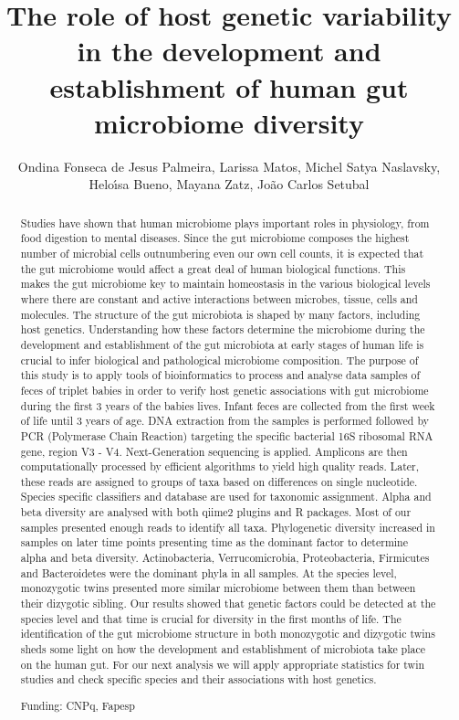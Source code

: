 \documentclass[twoside]{article}
\title{\vspace{-15mm}\fontsize{24pt}{10pt}\selectfont\textbf{ The role of host genetic variability in the development and establishment of human gut microbiome diversity }} %
\author{ Ondina Fonseca de Jesus Palmeira, Larissa Matos, Michel Satya Naslavsky, Helo\'{\i}sa Bueno, Mayana Zatz, Jo\~ao Carlos Setubal }
\affil{ Institute of Mathematics and Statistics - University of S\~ao Paulo }
\date{}
\begin{document}
  
  
  \maketitle %
  
  
  \thispagestyle{fancy} %
  
  
  \begin{abstract}
  Studies have shown that human microbiome plays important roles in physiology,  from food digestion to mental diseases. Since the gut microbiome composes the highest number of microbial cells outnumbering even our own cell counts,  it is expected that the gut microbiome would affect a great deal of human biological functions. This makes the gut microbiome key to maintain homeostasis in the various biological levels where there are constant and active interactions between microbes,  tissue,  cells and molecules. The structure of the gut microbiota is shaped by many factors,  including host genetics. Understanding how these factors determine the microbiome during the development and establishment of the gut microbiota at early stages of human life is crucial to infer biological and pathological microbiome composition. The purpose of this study is to apply tools of bioinformatics to process and analyse data samples of feces of triplet babies in order to verify host genetic associations with gut microbiome during the first 3 years of the babies lives. Infant feces are collected from the first week of life until 3 years of age. DNA extraction from the samples is performed followed by PCR (Polymerase Chain Reaction) targeting the specific bacterial 16S ribosomal RNA gene,  region V3 - V4. Next-Generation sequencing is applied. Amplicons are then computationally processed by efficient algorithms to yield high quality reads. Later,  these reads are assigned to groups of taxa based on differences on  single nucleotide. Species specific classifiers and database are used for taxonomic assignment. Alpha and beta diversity are analysed with both qiime2 plugins and R packages. Most of our samples presented enough reads to identify all taxa. Phylogenetic diversity increased in samples on later time points presenting time as the dominant factor to determine alpha and beta diversity. Actinobacteria,  Verrucomicrobia,  Proteobacteria,  Firmicutes and Bacteroidetes were the dominant phyla in all samples. At the species level,  monozygotic twins presented more similar microbiome between them than between their dizygotic sibling. Our results showed that genetic factors could be detected at the species level and that time is crucial for diversity in the first months of life. The identification of the gut microbiome structure in both monozygotic and dizygotic twins sheds some light on how the development and establishment of microbiota take place on the human gut. For our next analysis we will apply appropriate statistics for twin studies and check specific species and their associations with host genetics.
  
  Funding: CNPq,  Fapesp \\ 
  \end{abstract}
  
\end{document}
